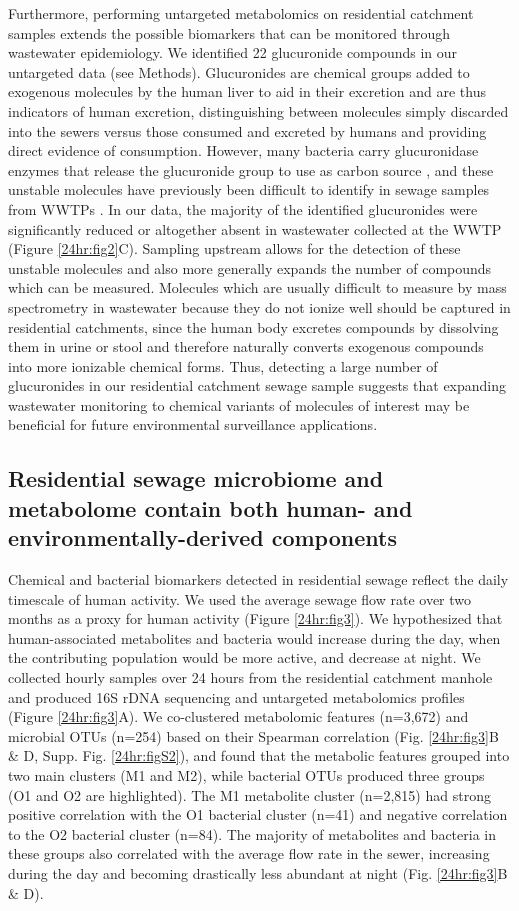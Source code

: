 Furthermore, performing untargeted metabolomics on residential catchment samples extends the possible biomarkers that can be monitored through wastewater epidemiology. We identified 22 glucuronide compounds in our untargeted data (see Methods). Glucuronides are chemical groups added to exogenous molecules by the human liver to aid in their excretion and are thus indicators of human excretion, distinguishing between molecules simply discarded into the sewers versus those consumed and excreted by humans and providing direct evidence of consumption. However, many bacteria carry glucuronidase enzymes that release the glucuronide group to use as carbon source \cite{Pollet2017}, and these unstable molecules have previously been difficult to identify in sewage samples from WWTPs \cite{Jacox2017}. In our data, the majority of the identified glucuronides were significantly reduced or altogether absent in wastewater collected at the WWTP (Figure \ref{24hr:fig2}C). Sampling upstream allows for the detection of these unstable molecules and also more generally expands the number of compounds which can be measured. Molecules which are usually difficult to measure by mass spectrometry in wastewater because they do not ionize well should be captured in residential catchments, since the human body excretes compounds by dissolving them in urine or stool and therefore naturally converts exogenous compounds into more ionizable chemical forms. Thus, detecting a large number of glucuronides in our residential catchment sewage sample suggests that expanding wastewater monitoring to chemical variants of molecules of interest may be beneficial for future environmental surveillance applications.

\subsection{Residential sewage microbiome and metabolome contain both human- and environmentally-derived components}

Chemical and bacterial biomarkers detected in residential sewage reflect the daily timescale of human activity. We used the average sewage flow rate over two months as a proxy for human activity (Figure \ref{24hr:fig3}). We hypothesized that human-associated metabolites and bacteria would increase during the day, when the contributing population would be more active, and decrease at night. We collected hourly samples over 24 hours from the residential catchment manhole and produced 16S rDNA sequencing and untargeted metabolomics profiles (Figure \ref{24hr:fig3}A). We co-clustered metabolomic features (n=3,672) and microbial OTUs (n=254) based on their Spearman correlation (Fig. \ref{24hr:fig3}B \& D, Supp. Fig. \ref{24hr:figS2}), and found that the metabolic features grouped into two main clusters (M1 and M2), while bacterial OTUs produced three groups (O1 and O2 are highlighted). The M1 metabolite cluster (n=2,815) had strong positive correlation with the O1 bacterial cluster (n=41) and negative correlation to the O2 bacterial cluster (n=84). The majority of metabolites and bacteria in these groups also correlated with the average flow rate in the sewer, increasing during the day and becoming drastically less abundant at night (Fig. \ref{24hr:fig3}B \& D).


